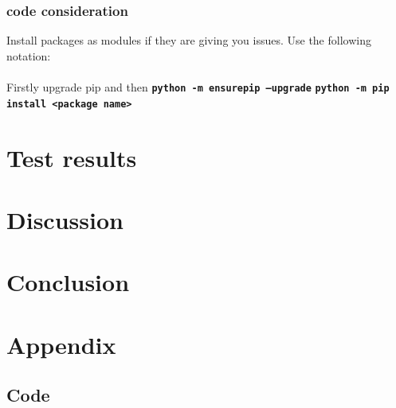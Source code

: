 \documentclass{article}
\begin{document}
\subsubsection{code consideration}
Install packages as modules if they are giving you issues. Use the following notation:\\
\\

Firstly upgrade pip and then \textbf{\texttt{python -m ensurepip --upgrade}}
\textbf{\texttt{python -m pip install <package name>}}
\\
\section{Test results}
\section{Discussion}
\section{Conclusion}
\section{Appendix}



\subsection{Code}
\end{document}
